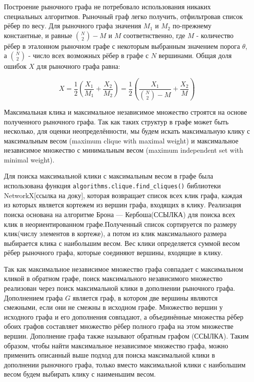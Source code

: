 Построение рыночного графа не потребовало использования никаких специальных алгоритмов. Рыночный граф легко получить, отфильтровав список рёбер по весу.
Для рыночного графа значения $M_1$ и $M_2$ по-прежнему константные, и равные $\binom{N}{2} - M$ и $M$ соответнственно, где $M$ - количество рёбер в эталонном рыночном графе с некоторым выбранным значением порога $\theta$, а $\binom{N}{2}$ - число всех возможных рёбер в графе с $N$ вершинами. Общая доля ошибок $X$ для рыночного графа равна:

\begin{equation}
X = \frac{1}{2}\left(\frac{X_1}{M_1} + \frac{X_2}{M_2}\right) = \frac{1}{2}\left(\frac{X_1}{\binom{N}{2} - M} + \frac{X_2}{M}\right)
\end{equation}


Максимальная клика и максимальное независимое множество строятся на основе полученного рыночного графа. Так как таких структур в графе может быть несколько, для оценки неопределённости, мы будем искать максимальную клику с максимальным весом (maximum clique with maximal weight) и максимальное независимое множество с минимальным весом (maximum independent set with minimal weight).  

Для поиска максимальной клики с максимальным весом в графе была использована функция \verb|algorithms.clique.find_cliques()| библиотеки NetworkX[ссылка на доку], которая возвращает список всех клик графа, каждая из которых является кортежем из вершин графа, входящих в клику. Реализация поиска основана на алгоритме Брона — Кербоша(ССЫЛКА) для поиска всех клик в неориентированном графе.Полученный список сортируется по размеру клик(числу элементов в кортеже), а потом из клик максимального размера выбирается клика с наибольшим весом. Вес клики определяется суммой весом рёбер рыночного графа, которые соединяют вершины, входящие в клику.


Так как максимальное независимое множество графа совпадает с максимальном кликой в обратном графе, поиск максимального независимого множество реализован через поиск максимальной клики в дополнении рыночного графа. Дополнением графа $G$ является граф, в котором две вершины являются смежными, если они не смежны в исходном графе. Множество вершин у исходного графа и его дополнения совпадают, а объединённые множества рёбер обоих графов составляет множество рёбер полного графа на этом множестве вершин. Дополнение графа также называют обратным графом (ССЫЛКА). Таким образом, чтобы найти максимальное независимое множество графа, можно применить описанный выше подход для поиска максимальной клики в дополнении рыночного графа, только вместо максимальной клики с наибольшим весом будем выбирать клику с наименьшим весом.

